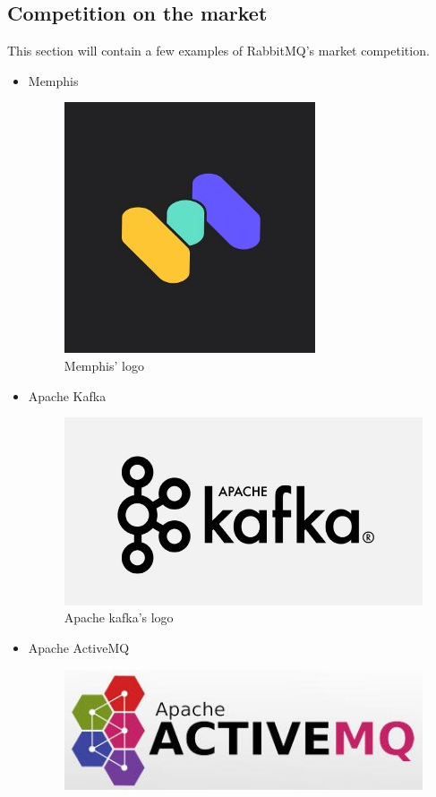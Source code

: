 \documentclass[12pt]{article}
\begin{document}
\subsection*{Competition on the market}
This section will contain a few examples of RabbitMQ's market competition.
\begin{itemize}
    \item Memphis
    \begin{figure}[H]
        \centering
        \includegraphics[scale = 0.5]{Images/memphis.jpeg}
        \caption{Memphis' logo}
        \label{fig:memphis}
    \end{figure}
    \newpage
    \item Apache Kafka
    \begin{figure}[H]
        \centering
        \includegraphics[scale = 0.4]{Images/kafka.jpg}
        \caption{Apache kafka's logo}
        \label{fig:kafka}
    \end{figure}
    \item Apache ActiveMQ
    \begin{figure}[H]
        \centering
        \includegraphics{Images/active.jpg}

\end{figure}
\end{itemize}
\end{document}
